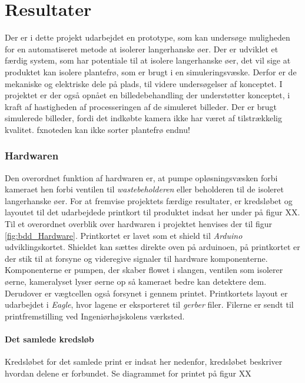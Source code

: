 \chapter{Resultater}

Der er i dette projekt udarbejdet en prototype, som kan undersøge muligheden for en automatiseret metode at isolerer langerhanske øer. Der er udviklet et færdig system, som har potentiale til at isolere langerhanske øer, det vil sige at produktet kan isolere plantefrø, som er brugt i en simuleringsvæske. Derfor er de mekaniske og elektriske dele på plads, til videre undersøgelser af konceptet. I projektet er der også opnået en billedebehandling der understøtter konceptet, i kraft af hastigheden af processeringen af de simuleret billeder. Der er brugt simulerede billeder, fordi det indkøbte kamera ikke har været af tilstrækkelig kvalitet. fxnote{den kan ikke sorter plantefrø endnu!}



\subsection{Hardwaren}

Den overordnet funktion af hardwaren er, at pumpe opløsningsvæsken forbi kameraet hen forbi ventilen til \textit{wastebeholderen} eller beholderen til de isoleret langerhanske øer. For at fremvise projektets færdige resultater, er kredsløbet og layoutet til det udarbejdede printkort til produktet indsat her under på figur XX. Til et overordnet overblik over hardwaren i projektet henvises der til figur \ref{fig:bdd_Hardware}. Printkortet er lavet som et shield til \textit{Arduino} udviklingskortet. Shieldet kan sættes direkte oven på arduinoen, på printkortet er der stik til at forsyne og videregive signaler til hardware komponenterne. Komponenterne er pumpen, der skaber flowet i slangen, ventilen som isolerer øerne, kameralyset lyser øerne op så kameraet bedre kan detektere dem. Derudover er vægtcellen også forsynet i gennem printet. Printkortets layout er udarbejdet i \textit{Eagle}, hvor lagene er eksporteret til \textit{gerber} filer. Filerne er sendt til printfremstilling ved Ingeniørhøjskolens værksted.

\subsubsection{Det samlede kredsløb}

Kredsløbet for det samlede print er indsat her nedenfor, kredsløbet beskriver hvordan delene er forbundet. 
Se diagrammet for printet på figur XX

